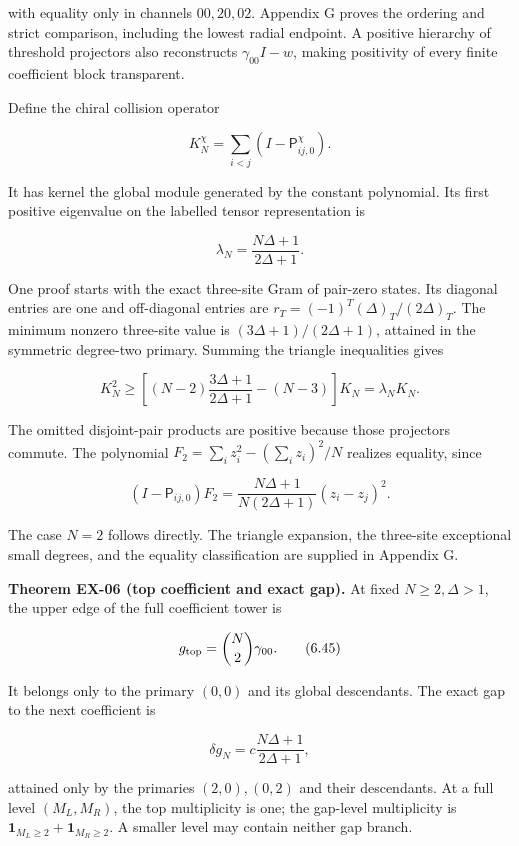 with equality only in channels \(00,20,02\). Appendix G proves the ordering and strict comparison, including the lowest radial endpoint. A positive hierarchy of threshold projectors also reconstructs \(\gamma_{00}I-w\), making positivity of every finite coefficient block transparent.

Define the chiral collision operator

\[
K_N^\chi=\sum_{i<j}(I-\mathsf P^\chi_{ij,0}).
\tag{6.41}
\]

It has kernel the global module generated by the constant polynomial. Its first positive eigenvalue on the labelled tensor representation is

\[
\lambda_N=\frac{N\Delta+1}{2\Delta+1}.
\tag{6.42}
\]

One proof starts with the exact three-site Gram of pair-zero states. Its diagonal entries are one and off-diagonal entries are \(r_T=(-1)^T(\Delta)_T/(2\Delta)_T\). The minimum nonzero three-site value is \((3\Delta+1)/(2\Delta+1)\), attained in the symmetric degree-two primary. Summing the triangle inequalities gives

\[
K_N^2\ge\left[(N-2)\frac{3\Delta+1}{2\Delta+1}-(N-3)\right]K_N
=\lambda_NK_N.
\tag{6.43}
\]

The omitted disjoint-pair products are positive because those projectors commute. The polynomial \(F_2=\sum_i z_i^2-(\sum_i z_i)^2/N\) realizes equality, since

\[
(I-\mathsf P_{ij,0})F_2
=\frac{N\Delta+1}{N(2\Delta+1)}(z_i-z_j)^2.
\tag{6.44}
\]

The case \(N=2\) follows directly. The triangle expansion, the three-site exceptional small degrees, and the equality classification are supplied in Appendix G.

\textbf{Theorem EX-06 (top coefficient and exact gap).} At fixed \(N\ge2,\Delta>1\), the upper edge of the full coefficient tower is

\[
g_{\rm top}=\binom N2\gamma_{00}.
\tag{6.45}
\]

It belongs only to the primary \((0,0)\) and its global descendants. The exact gap to the next coefficient is

\[
\delta g_N=c\frac{N\Delta+1}{2\Delta+1},
\tag{6.46}
\]

attained only by the primaries \((2,0),(0,2)\) and their descendants. At a full level \((M_L,M_R)\), the top multiplicity is one; the gap-level multiplicity is \(\mathbf1_{M_L\ge2}+\mathbf1_{M_R\ge2}\). A smaller level may contain neither gap branch.

